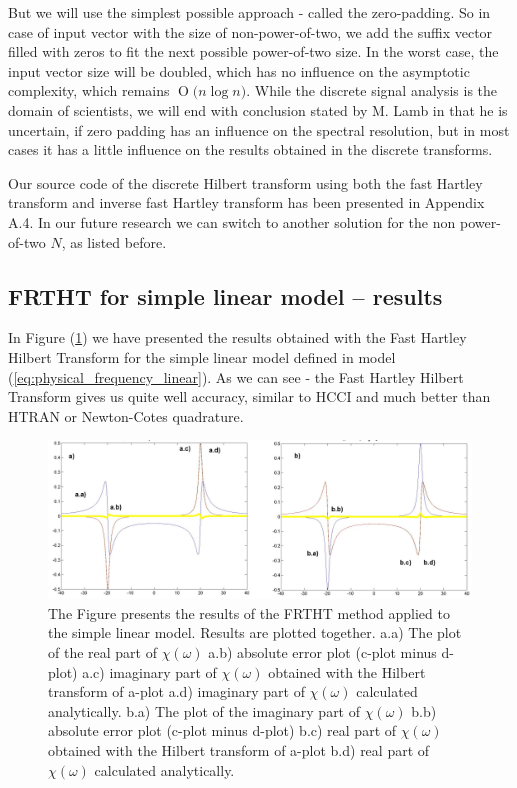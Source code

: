 \documentclass[12pt,twoside,a4paper]{article}
\numberwithin{equation}{subsection}
\numberwithin{figure}{subsection}
\newcommand{\BigO}[1]{\ensuremath{\operatorname{O}\bigl(#1\bigr)}}
\begin{document}
But we will use the simplest possible approach - called the zero-padding. So in case of input vector with the size of non-power-of-two, we add the suffix vector filled with zeros to fit the next possible power-of-two size. In the worst case, the input vector size will be doubled, which has no influence on the asymptotic complexity, which remains $\BigO{n \log n}$. While the discrete signal analysis is the domain of scientists, we will end with conclusion stated by M. Lamb in \cite{lamb_issues} that he is uncertain, if zero padding has an influence on the spectral resolution, but in most cases it has a little influence on the results obtained in the discrete transforms.

Our source code of the discrete Hilbert transform using both the fast Hartley transform and inverse fast Hartley transform has been presented in Appendix A.4. In our future research we can switch to another solution for the non power-of-two $N$, as listed before.

\subsection{FRTHT for simple linear model -- results} \label{chap:hartley_lin}

In Figure (\ref{fig:fht_lin}) we have presented the results obtained with the Fast Hartley Hilbert Transform for the simple linear model defined in model (\ref{eq:physical_frequency_linear}). As we can see - the Fast Hartley Hilbert Transform gives us quite well accuracy, similar to HCCI and much better than HTRAN or Newton-Cotes quadrature.

\begin{figure} 
  \includegraphics[width=150mm]{img/fht_lin.png}
  \caption{The Figure presents the results of the FRTHT method applied to the simple linear model. Results are plotted together.
   a.a) The plot of the real part of $\chi (\omega )$ 
   a.b) absolute error plot (c-plot minus d-plot) 
   a.c) imaginary part of $\chi (\omega )$ obtained with the Hilbert transform of a-plot 
   a.d) imaginary part of $\chi (\omega )$  calculated analytically. 
   b.a) The plot of the imaginary part of $\chi (\omega )$ 
   b.b) absolute error plot (c-plot minus d-plot) 
   b.c) real part of $\chi (\omega )$ obtained with the Hilbert transform of a-plot 
   b.d) real part of $\chi (\omega )$ calculated analytically. \label{fig:fht_lin}
  }
\end{figure}
\end{document}
